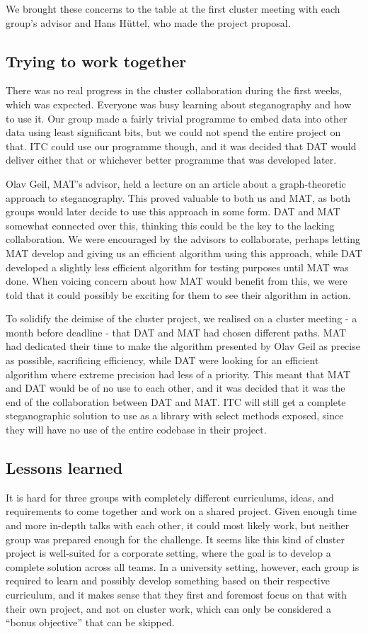 We brought these concerns to the table at the first cluster meeting with each group's advisor and Hans Hüttel, who made the project proposal.

\subsection{Trying to work together}
There was no real progress in the cluster collaboration during the first weeks, which was expected.
Everyone was busy learning about steganography and how to use it.
Our group made a fairly trivial programme to embed data into other data using least significant bits, but we could not spend the entire project on that.
ITC could use our programme though, and it was decided that DAT would deliver either that or whichever better programme that was developed later.

Olav Geil, MAT's advisor, held a lecture on an article about a graph-theoretic approach to steganography.
This proved valuable to both us and MAT, as both groups would later decide to use this approach in some form.
DAT and MAT somewhat connected over this, thinking this could be the key to the lacking collaboration.
We were encouraged by the advisors to collaborate, perhaps letting MAT develop and giving us an efficient algorithm using this approach, while DAT developed a slightly less efficient algorithm for testing purposes until MAT was done.
When voicing concern about how MAT would benefit from this, we were told that it could possibly be exciting for them to see their algorithm in action.

To solidify the deimise of the cluster project, we realised on a cluster meeting - a month before deadline - that DAT and MAT had chosen different paths.
MAT had dedicated their time to make the algorithm presented by Olav Geil as precise as possible, sacrificing efficiency, while DAT were looking for an efficient algorithm where extreme precision had less of a priority.
This meant that MAT and DAT would be of no use to each other, and it was decided that it was the end of the collaboration between DAT and MAT.
ITC will still get a complete steganographic solution to use as a library with select methods exposed, since they will have no use of the entire codebase in their project.

\subsection{Lessons learned}
It is hard for three groups with completely different curriculums, ideas, and requirements to come together and work on a shared project.
Given enough time and more in-depth talks with each other, it could most likely work, but neither group was prepared enough for the challenge.
It seems like this kind of cluster project is well-suited for a corporate setting, where the goal is to develop a complete solution across all teams.
In a university setting, however, each group is required to learn and possibly develop something based on their respective curriculum, and it makes sense that they first and foremost focus on that with their own project, and not on cluster work, which can only be considered a ``bonus objective'' that can be skipped.

